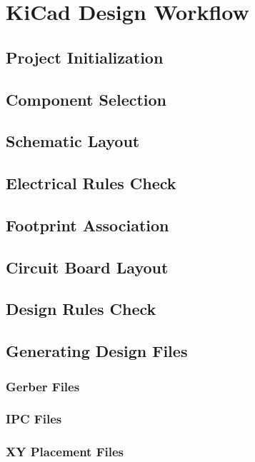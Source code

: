 
\chapter{KiCad Design Workflow}
\section{Project Initialization}
\section{Component Selection}
\section{Schematic Layout}
\section{Electrical Rules Check}
\section{Footprint Association}
\section{Circuit Board Layout}
\section{Design Rules Check}
\section{Generating Design Files}
\subsection{Gerber Files}
\subsection{IPC Files}
\subsection{XY Placement Files}